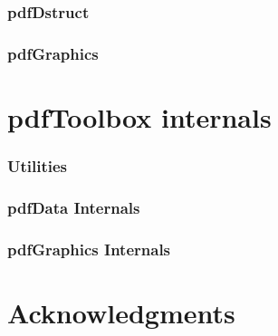 

\section{pdfDstruct}



\section{pdfGraphics}



\part{pdfToolbox internals}

\section{Utilities}



\section{pdfData Internals}



\section{pdfGraphics Internals}



\part{Acknowledgments}



\bye

